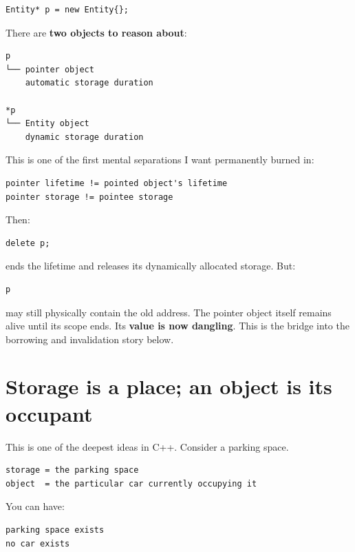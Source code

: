 \begin{verbatim}
Entity* p = new Entity{};
\end{verbatim}

There are \textbf{two objects to reason about}:

\begin{verbatim}
p
└── pointer object
    automatic storage duration

*p
└── Entity object
    dynamic storage duration
\end{verbatim}

This is one of the first mental separations I want permanently burned in:

\begin{verbatim}
pointer lifetime != pointed object's lifetime
pointer storage != pointee storage
\end{verbatim}

Then:

\begin{verbatim}
delete p;
\end{verbatim}

ends the  lifetime and releases its dynamically allocated storage. But:

\begin{verbatim}
p
\end{verbatim}

may still physically contain the old address. The pointer object itself remains alive until its scope ends. Its \textbf{value is now dangling}. This is the bridge into the borrowing and invalidation story below.

\section{Storage is a place; an object is its occupant}\label{01-foundations-i-ch002-storage-is-a-place-an-object-is-its-occupant}

\hypertarget{01-foundations-i-ch002-storage-is-a-place-an-object-is-its-occupant}{}

This is one of the deepest ideas in C++. Consider a parking space.

\begin{verbatim}
storage = the parking space
object  = the particular car currently occupying it
\end{verbatim}

You can have:

\begin{verbatim}
parking space exists
no car exists
\end{verbatim}

